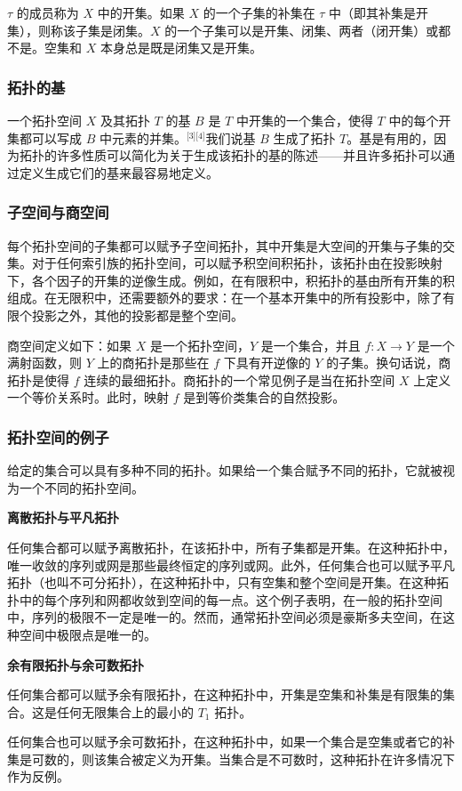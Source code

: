 $\tau$ 的成员称为 $X$ 中的开集。如果 $X$ 的一个子集的补集在 $\tau$ 中（即其补集是开集），则称该子集是闭集。$X$ 的一个子集可以是开集、闭集、两者（闭开集）或都不是。空集和 $X$ 本身总是既是闭集又是开集。
\subsubsection{拓扑的基}
一个拓扑空间 $X$ 及其拓扑 $T$ 的基 $B$ 是 $T$ 中开集的一个集合，使得 $T$ 中的每个开集都可以写成 $B$ 中元素的并集。\(^\text{[3][4]}\)我们说基 $B$ 生成了拓扑 $T$。基是有用的，因为拓扑的许多性质可以简化为关于生成该拓扑的基的陈述——并且许多拓扑可以通过定义生成它们的基来最容易地定义。
\subsubsection{子空间与商空间}
每个拓扑空间的子集都可以赋予子空间拓扑，其中开集是大空间的开集与子集的交集。对于任何索引族的拓扑空间，可以赋予积空间积拓扑，该拓扑由在投影映射下，各个因子的开集的逆像生成。例如，在有限积中，积拓扑的基由所有开集的积组成。在无限积中，还需要额外的要求：在一个基本开集中的所有投影中，除了有限个投影之外，其他的投影都是整个空间。

商空间定义如下：如果 $X$ 是一个拓扑空间，$Y$ 是一个集合，并且 $f : X \to Y$ 是一个满射函数，则 $Y$ 上的商拓扑是那些在 $f$ 下具有开逆像的 $Y$ 的子集。换句话说，商拓扑是使得 $f$ 连续的最细拓扑。商拓扑的一个常见例子是当在拓扑空间 $X$ 上定义一个等价关系时。此时，映射 $f$ 是到等价类集合的自然投影。
\subsubsection{拓扑空间的例子}
给定的集合可以具有多种不同的拓扑。如果给一个集合赋予不同的拓扑，它就被视为一个不同的拓扑空间。

\textbf{离散拓扑与平凡拓扑}

任何集合都可以赋予离散拓扑，在该拓扑中，所有子集都是开集。在这种拓扑中，唯一收敛的序列或网是那些最终恒定的序列或网。此外，任何集合也可以赋予平凡拓扑（也叫不可分拓扑），在这种拓扑中，只有空集和整个空间是开集。在这种拓扑中的每个序列和网都收敛到空间的每一点。这个例子表明，在一般的拓扑空间中，序列的极限不一定是唯一的。然而，通常拓扑空间必须是豪斯多夫空间，在这种空间中极限点是唯一的。

\textbf{余有限拓扑与余可数拓扑}

任何集合都可以赋予余有限拓扑，在这种拓扑中，开集是空集和补集是有限集的集合。这是任何无限集合上的最小的 $T_1$ 拓扑。

任何集合也可以赋予余可数拓扑，在这种拓扑中，如果一个集合是空集或者它的补集是可数的，则该集合被定义为开集。当集合是不可数时，这种拓扑在许多情况下作为反例。

